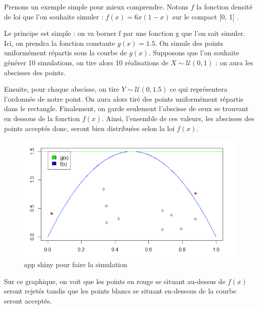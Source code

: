 \documentclass[10pt]{article} %
\begin{document}
Prenons un exemple simple pour mieux comprendre. Notons $f$ la fonction densité de loi que l'on souhaite simuler : $f(x) = 6x(1-x) $ sur le compact [0, 1] .

Le principe est simple : on va borner f par une fonction g que l'on sait simuler. Ici, on prendra la fonction constante $g(x) = 1.5 $. On simule des points uniformément répartis sous la courbe de $g(x)$. Supposons que l'on souhaite générer 10 simulations, on tire alors 10 réalisations de $X \sim \mathcal{U}(0, 1)$ : on aura les abscisses des points.

Ensuite, pour chaque abscisse, on tire $Y \sim \mathcal{U}(0, 1.5)$ ce qui représentera l'ordonnée de notre point. On aura alors tiré des points uniformément répartis dans le rectangle. Finalement, on garde seulement l'abscisse de ceux se trouvant en dessous de la fonction $f(x)$. Ainsi, l'ensemble de ces valeurs, les abscisses des points acceptés donc, seront bien distribuées selon la loi $f(x)$.

\newpage
\begin{figure}[h!]
\centering
\includegraphics[width=\linewidth]{media/graph_acceptation_rejet.png}

\caption{app shiny pour faire la simulation}
\end{figure}

Sur ce graphique, on voit que les points en rouge se situant au-dessus de $f(x)$ seront rejetés tandis que les points blancs se situant en-dessous de la courbe seront acceptés.
\end{document}
